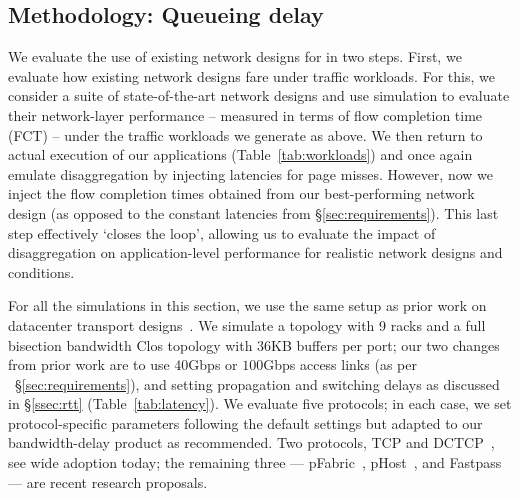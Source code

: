 \vspace{-0.1in}
\subsection{Methodology: Queueing delay}
\label{ssec:ssmethod}
\vspace{-0.05in}
We evaluate the use of existing network designs for \dis in two steps.
First, we evaluate how existing network designs fare under \dis traffic workloads. 
For this, we consider a suite of state-of-the-art network designs and use simulation to evaluate their network-layer performance -- measured in terms of flow completion time (FCT) -- under the traffic workloads we generate as above.
We then return to actual execution of our applications (Table~\ref{tab:workloads}) and once again emulate disaggregation by injecting latencies for page misses. 
However, now we inject the flow completion times obtained from our best-performing network design (as opposed to the constant latencies from \S\ref{sec:requirements}). This last step effectively `closes the loop', allowing us to evaluate the impact of disaggregation on application-level performance for realistic network designs and conditions. 

For all the simulations in this section, we use the same setup as prior work on datacenter transport designs~\cite{pfabric, phost}. 
We simulate a %
topology with 9 racks and a full bisection bandwidth Clos topology with $36$KB buffers per port; our two changes from prior work are to use $40$Gbps or $100$Gbps access links (as per ~\S\ref{sec:requirements}), and setting propagation and switching delays as discussed in \S\ref{ssec:rtt} (Table~\ref{tab:latency}).
We evaluate five protocols; in each case, we set protocol-specific parameters following the default settings but adapted to our bandwidth-delay product as recommended. Two protocols, TCP and DCTCP~\cite{dctcp}, see wide adoption today; the remaining three --- pFabric~\cite{pfabric}, pHost~\cite{phost}, and Fastpass~\cite{fastpass} --- are recent research proposals.


